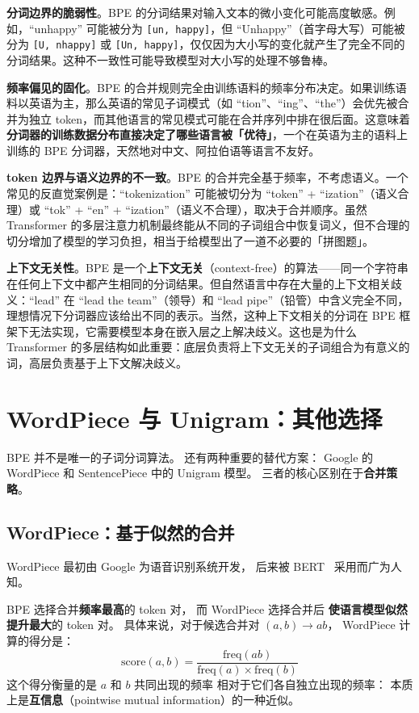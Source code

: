 \textbf{分词边界的脆弱性}。BPE 的分词结果对输入文本的微小变化可能高度敏感。例如，“unhappy” 可能被分为 \texttt{[un, happy]}，但 “Unhappy”（首字母大写）可能被分为 \texttt{[U, nhappy]} 或 \texttt{[Un, happy]}，仅仅因为大小写的变化就产生了完全不同的分词结果。这种不一致性可能导致模型对大小写的处理不够鲁棒。

\textbf{频率偏见的固化}。BPE 的合并规则完全由训练语料的频率分布决定。如果训练语料以英语为主，那么英语的常见子词模式（如 “tion”、“ing”、“the”）会优先被合并为独立 token，而其他语言的常见模式可能在合并序列中排在很后面。这意味着\textbf{分词器的训练数据分布直接决定了哪些语言被「优待」}，一个在英语为主的语料上训练的 BPE 分词器，天然地对中文、阿拉伯语等语言不友好。

\textbf{token 边界与语义边界的不一致}。BPE 的合并完全基于频率，不考虑语义。一个常见的反直觉案例是：“tokenization” 可能被切分为 “token” + “ization”（语义合理）或 “tok” + “en” + “ization”（语义不合理），取决于合并顺序。虽然 Transformer 的多层注意力机制最终能从不同的子词组合中恢复词义，但不合理的切分增加了模型的学习负担，相当于给模型出了一道不必要的「拼图题」。

\textbf{上下文无关性}。BPE 是一个\textbf{上下文无关}（context-free）的算法——同一个字符串在任何上下文中都产生相同的分词结果。但自然语言中存在大量的上下文相关歧义：“lead” 在 “lead the team”（领导）和 “lead pipe”（铅管）中含义完全不同，理想情况下分词器应该给出不同的表示。当然，这种上下文相关的分词在 BPE 框架下无法实现，它需要模型本身在嵌入层之上解决歧义。这也是为什么 Transformer 的多层结构如此重要：底层负责将上下文无关的子词组合为有意义的词，高层负责基于上下文解决歧义。

\section{WordPiece 与 Unigram：其他选择}

BPE 并不是唯一的子词分词算法。
还有两种重要的替代方案：
Google 的 WordPiece 和 SentencePiece 中的 Unigram 模型。
三者的核心区别在于\textbf{合并策略}。

\subsection{WordPiece：基于似然的合并}

WordPiece 最初由 Google 为语音识别系统开发，
后来被 BERT~\cite{devlin2019bert} 采用而广为人知。

BPE 选择合并\textbf{频率最高}的 token 对，
而 WordPiece 选择合并后
\textbf{使语言模型似然提升最大}的 token 对。
具体来说，对于候选合并对 $(a, b) \to ab$，
WordPiece 计算的得分是：
\begin{equation}
  \text{score}(a, b) = \frac{\text{freq}(ab)}{\text{freq}(a) \times \text{freq}(b)}
\end{equation}
这个得分衡量的是 $a$ 和 $b$ 共同出现的频率
相对于它们各自独立出现的频率：
本质上是\textbf{互信息}（pointwise mutual information）的一种近似。

